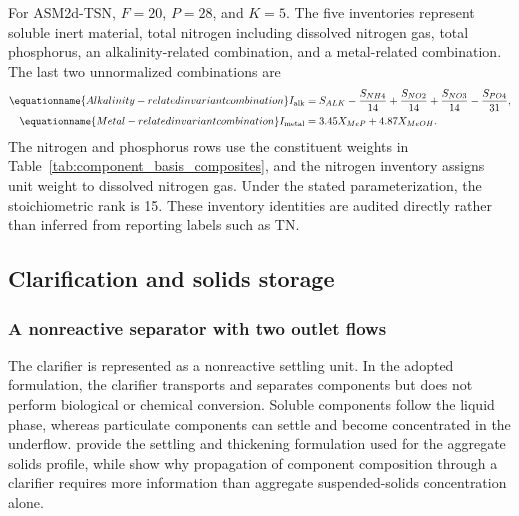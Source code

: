 For ASM2d-TSN, $F=20$, $P=28$, and $K=5$. The five inventories represent soluble inert material, total nitrogen including dissolved nitrogen gas, total phosphorus, an alkalinity-related combination, and a metal-related combination. The last two unnormalized combinations are
\begin{align}
\equationname{Alkalinity-related invariant combination}
I_{\rm alk}&=S_{ALK}-\frac{S_{NH4}}{14}
+\frac{S_{NO2}}{14}+\frac{S_{NO3}}{14}-\frac{S_{PO4}}{31},\\
\equationname{Metal-related invariant combination}
I_{\rm metal}&=3.45X_{MeP}+4.87X_{MeOH}.
\label{eq:plant_named_invariants}
\end{align}
The nitrogen and phosphorus rows use the constituent weights in Table~\ref{tab:component_basis_composites}, and the nitrogen inventory assigns unit weight to dissolved nitrogen gas. Under the stated parameterization, the stoichiometric rank is 15. These inventory identities are audited directly rather than inferred from reporting labels such as TN.

\subsection{Clarification and solids storage}

\subsubsection{A nonreactive separator with two outlet flows}

The clarifier is represented as a nonreactive settling unit. In the adopted formulation, the clarifier transports and separates components but does not perform biological or chemical conversion. Soluble components follow the liquid phase, whereas particulate components can settle and become concentrated in the underflow. \citet{Takacs1991} provide the settling and thickening formulation used for the aggregate solids profile, while \citet{JeppssonDiehl1996} show why propagation of component composition through a clarifier requires more information than aggregate suspended-solids concentration alone.

